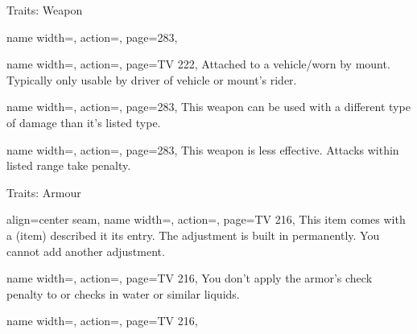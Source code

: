 \begin{PageBack}
\begin{Tables}{\backTableHeight}
\begin{Table}{Traits: Weapon}
\begin{entry}{}{%
                name width=\conditionLength,%
                action=\Unarmed,
                page=283,
            }
            \end{entry}
            \breakLine
            \begin{entry}{}{%
                name width=\conditionLength,%
                action=\Vehicular,
                page=TV 222,
            }
                Attached to a vehicle/worn by mount. Typically only usable by driver of vehicle or mount's
                rider. \hfill{}
            \end{entry}
            \begin{entry}{}{%
                name width=\conditionLength,%
                action=\Versatile,
                page=283,
            }
                This weapon can be used with a different type of damage than it's listed type.
            \end{entry}
            \begin{entry}{}{%
                name width=\conditionLength,%
                action=\Volley,
                page=283,
            }
                This weapon is less effective. Attacks within listed range take  penalty.
            \end{entry}
        \end{Table}
    \end{Tables}%
    \begin{Tables}{\backTableHeight}%
        \renewcommand{\TableSpace}{\\\vspace{2mm}\\}%
        \begin{Table}{Traits: Armour}
            \begin{entry}{}{%
                align=center seam,
                name width=\conditionLength,%
                action=\Adjusted,
                page=TV 216,
            }
                This item comes with a  (item) described it its entry. The adjustment is
                built in permanently. You cannot add another adjustment.
            \end{entry}
            \begin{entry}{}{%
                name width=\conditionLength,%
                action=\Aquadynamic,
                page=TV 216,
            }
                You don't apply the armor's check penalty to \AcrobaticsT or \AthleticsT checks in water or
                similar liquids.
            \end{entry}
            \begin{entry}{}{%
                name width=\conditionLength,%
                action=\Barding,
                page=TV 216,
            }

\end{entry}
\end{Table}
\end{Tables}
\end{PageBack}
